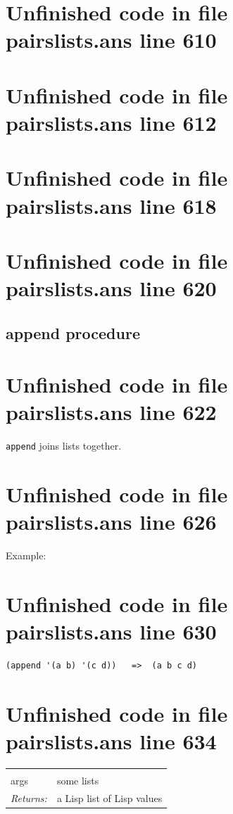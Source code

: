\documentclass[twoside,9pt]{report}
\begin{document}
\section{Unfinished code in file pairslists.ans line 610}
\section{Unfinished code in file pairslists.ans line 612}
\section{Unfinished code in file pairslists.ans line 618}
\section{Unfinished code in file pairslists.ans line 620}
\subsection{append procedure}
\label{append-procedure}
\section{Unfinished code in file pairslists.ans line 622}


\texttt{append} joins lists together.

\section{Unfinished code in file pairslists.ans line 626}


Example:

\section{Unfinished code in file pairslists.ans line 630}
\begin{verbatim}
(append '(a b) '(c d))   =>  (a b c d)
\end{verbatim}
\section{Unfinished code in file pairslists.ans line 634}
\noindent\begin{tabular}{ |p{1.9cm} p{8cm}| }
\hline
\rowcolor[HTML]{CCCCCC} \multicolumn{2}{|l|}{\bf append (public)} \\
args & some lists \\
\textit{Returns:} & a Lisp list of Lisp values \\
\hline
\end{tabular}
\end{document}
